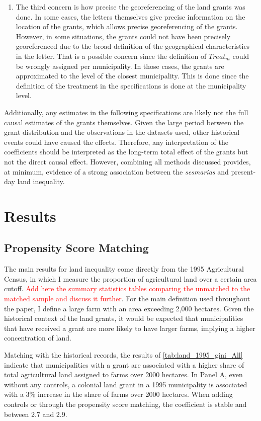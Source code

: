 \documentclass[11pt]{article}
\newcommand{\red}[1]{\textcolor{red}{#1}}
\begin{document}
\begin{enumerate}
  \item The third concern is how precise the georeferencing of the land grants was done. 
  In some cases, the letters themselves give precise information on the location of the grants, which allows precise georeferencing of the grants.
  However, in some situations, the grants could not have been precisely georeferenced due to the broad definition of the geographical characteristics in the letter. 
  That is a possible concern since the definition of $Treat_m$ could be wrongly assigned per municipality.
  In those cases, the grants are approximated to the level of the closest municipality.  
  This is done since the definition of the treatment in the specifications is done at the municipality level.
\end{enumerate}

Additionally, any estimates in the following specifications are likely not the full causal estimates of the grants themselves. 
Given the large period between the grant distribution and the observations in the datasets used, other historical events could have caused the effects. 
Therefore, any interpretation of the coefficients should be interpreted as the long-term total effect of the grants but not the direct causal effect.
However, combining all methods discussed provides, at minimum, evidence of a strong association between the \textit{sesmarias} and present-day land inequality.

\section{Results}
\label{sec:results}

\subsection{Propensity Score Matching}

The main results for land inequality come directly from the 1995 Agricultural Census, in which I measure the proportion of agricultural land over a certain area cutoff. 
\red{Add here the summary statistics tables comparing the unmatched to the matched sample and discuss it further}.
For the main definition used throughout the paper, I define a large farm with an area exceeding 2,000 hectares. 
Given the historical context of the land grants, it would be expected that municipalities that have received a grant are more likely to have larger farms, implying a higher concentration of land. 

Matching with the historical records, the results of \autoref{tab:land_1995_gini_All} indicate that municipalities with a grant are associated with a higher share of total agricultural land assigned to farms over 2000 hectares. 
In Panel A, even without any controls, a colonial land grant in a 1995 municipality is associated with a 3\% increase in the share of farms over 2000 hectares. 
When adding controls or through the propensity score matching, the coefficient is stable and between 2.7 and 2.9. 
\end{document}
